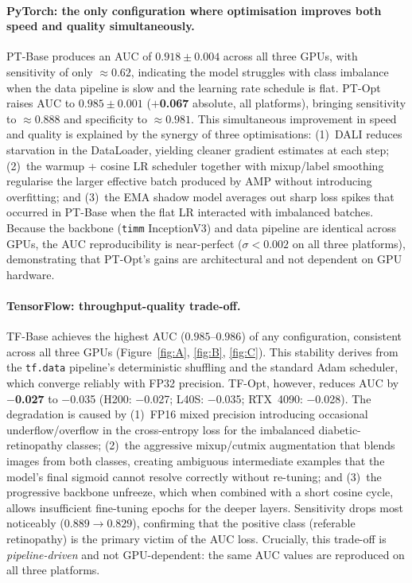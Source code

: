 \paragraph{PyTorch: the only configuration where optimisation improves both speed and quality simultaneously.}
PT-Base produces an AUC of $0.918 \pm 0.004$ across all three GPUs,
with sensitivity of only $\approx$$0.62$, indicating the model
struggles with class imbalance when the data pipeline is slow and the
learning rate schedule is flat.  PT-Opt raises AUC to $0.985 \pm
0.001$ (\textbf{$+$0.067} absolute, all platforms), bringing
sensitivity to $\approx$$0.888$ and specificity to $\approx$$0.981$.
This simultaneous improvement in speed and quality is explained by the
synergy of three optimisations: (1)~DALI reduces starvation in the
DataLoader, yielding cleaner gradient estimates at each step; (2)~the
warmup + cosine LR scheduler together with mixup/label smoothing
regularise the larger effective batch produced by AMP without
introducing overfitting; and (3)~the EMA shadow model averages out
sharp loss spikes that occurred in PT-Base when the flat LR interacted
with imbalanced batches.  Because the backbone (\texttt{timm}
InceptionV3) and data pipeline are identical across GPUs, the AUC
reproducibility is near-perfect ($\sigma < 0.002$ on all three
platforms), demonstrating that PT-Opt's gains are architectural and
not dependent on GPU hardware.

\paragraph{TensorFlow: throughput-quality trade-off.}
TF-Base achieves the highest AUC ($0.985$--$0.986$) of any
configuration, consistent across all three GPUs (Figure~\ref{fig:A},
\ref{fig:B}, \ref{fig:C}).  This stability derives from the
\texttt{tf.data} pipeline's deterministic shuffling and the standard
Adam scheduler, which converge reliably with FP32 precision.
TF-Opt, however, reduces AUC by \textbf{$-$0.027} to $-$0.035
(H200: $-$0.027; L40S: $-$0.035; RTX~4090: $-$0.028).  The
degradation is caused by (1)~FP16 mixed precision introducing
occasional underflow/overflow in the cross-entropy loss for the
imbalanced diabetic-retinopathy classes; (2)~the aggressive
mixup/cutmix augmentation that blends images from both classes,
creating ambiguous intermediate examples that the model's final
sigmoid cannot resolve correctly without re-tuning; and (3)~the
progressive backbone unfreeze, which when combined with a short cosine
cycle, allows insufficient fine-tuning epochs for the deeper layers.
Sensitivity drops most noticeably ($0.889 \to 0.829$), confirming that
the positive class (referable retinopathy) is the primary victim of the
AUC loss.  Crucially, this trade-off is \emph{pipeline-driven} and not
GPU-dependent: the same AUC values are reproduced on all three
platforms.

